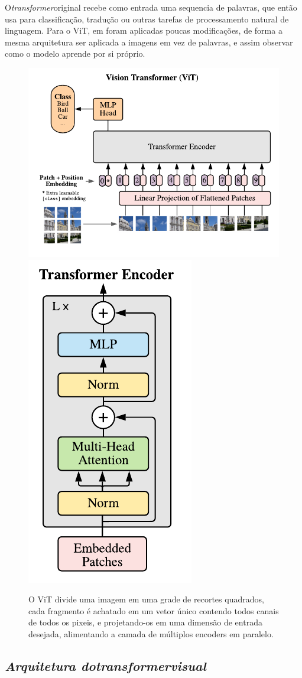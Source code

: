 O\textit{transformer}original recebe como entrada uma sequencia de palavras, que então usa para classificação, tradução ou outras tarefas de processamento natural de linguagem. Para o ViT, em \cite{dosovitskiy2020image} foram aplicadas poucas modificações, de forma a mesma arquitetura ser aplicada a imagens em vez de palavras, e assim observar como o modelo aprende por si próprio.

\begin{figure}[!ht]
    \centering
    \includegraphics[width=0.65\columnwidth]{
        Imagens/vit.png
    }
    \includegraphics[width=0.34\columnwidth]{
        Imagens/encoder.png
    }
    \caption{O ViT divide uma imagem em uma grade de recortes quadrados, cada fragmento é achatado em um vetor único contendo todos canais de todos os pixeis, e projetando-os em uma dimensão de entrada desejada, alimentando a camada de múltiplos encoders em paralelo.}
    \label{fig:vit}
\end{figure}


\subsection{\textit{Arquitetura do\textit{transformer}visual}}\label{sec:Cap2_vit}

